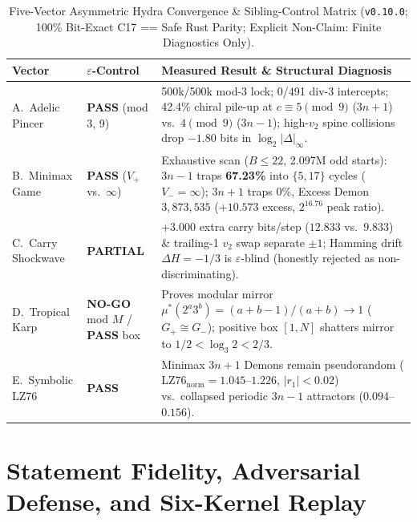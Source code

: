 \documentclass[11pt,reqno]{amsart}
\theoremstyle{plain}
\theoremstyle{definition}
\begin{document}
\begin{table}[htbp]
\centering
\caption{Five-Vector Asymmetric Hydra Convergence \& Sibling-Control Matrix (\texttt{v0.10.0};
100\% Bit-Exact C17 == Safe Rust Parity; Explicit Non-Claim: Finite Diagnostics Only).}
\label{tab:hydra}
\scriptsize
\setlength{\tabcolsep}{3.5pt}
\begin{tabularx}{\textwidth}{@{}l>{\raggedright\arraybackslash}p{2.3cm}>{\raggedright\arraybackslash}X@{}}
\toprule
Vector & $\varepsilon$-Control & Measured Result \& Structural Diagnosis \\
\midrule
A.\ Adelic Pincer & \textbf{PASS} (mod 3, 9) & 500k/500k mod-3 lock; 0/491 div-3 intercepts; 42.4\% chiral pile-up at $c \equiv 5 \pmod 9$ ($3n+1$) vs.\ $4 \pmod 9$ ($3n-1$); high-$v_2$ spine collisions drop $-1.80$ bits in $\log_2|\Delta|_\infty$. \\
B.\ Minimax Game & \textbf{PASS} ($V_+$ vs.\ $\infty$) & Exhaustive scan ($B\le 22$, 2.097M odd starts): $3n-1$ traps \textbf{67.23\%} into $\{5,17\}$ cycles ($V_- = \infty$); $3n+1$ traps $0\%$, Excess Demon $3{,}873{,}535$ ($+10.573$ excess, $2^{16.76}$ peak ratio). \\
C.\ Carry Shockwave & \textbf{PARTIAL} & $+3.000$ extra carry bits/step ($12.833$ vs.\ $9.833$) \& trailing-1 $v_2$ swap separate $\pm 1$; Hamming drift $\Delta H = -1/3$ is $\varepsilon$-blind (honestly rejected as non-discriminating). \\
D.\ Tropical Karp & \textbf{NO-GO} mod $M$ / \textbf{PASS} box & Proves modular mirror $\mu^*(2^a 3^b) = (a+b-1)/(a+b) \to 1$ ($G_+ \cong G_-$); positive box $[1, N]$ shatters mirror to $1/2 < \log_3 2 < 2/3$. \\
E.\ Symbolic LZ76 & \textbf{PASS} & Minimax $3n+1$ Demons remain pseudorandom ($\mathrm{LZ76}_{\text{norm}} = 1.045$--$1.226$, $|r_1| < 0.02$) vs.\ collapsed periodic $3n-1$ attractors ($0.094$--$0.156$). \\
\bottomrule
\end{tabularx}
\end{table}

\section{Statement Fidelity, Adversarial Defense, and Six-Kernel Replay}\label{sec:kernels}
\end{document}
